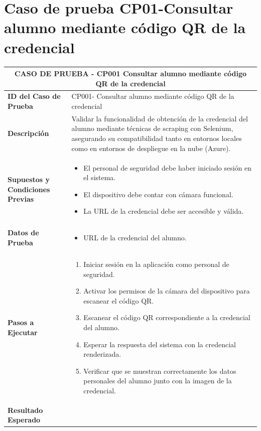 
\section{Caso de prueba CP01-Consultar alumno mediante código QR de la credencial}

\begin{longtable}{|p{5cm}|p{10cm}|}
	\hline
	\multicolumn{2}{|c|}{\textbf{CASO DE PRUEBA - CP001 Consultar alumno mediante código QR de la credencial}} \\
	\hline
	\textbf{ID del Caso de Prueba} & CP001- Consultar alumno mediante código QR de la credencial \\
	\hline
	\textbf{Descripción} & Validar la funcionalidad de obtención de la credencial del alumno mediante técnicas de scraping con Selenium, asegurando su compatibilidad tanto en entornos locales como en entornos de despliegue en la nube (Azure). \\
	\hline
	\textbf{Supuestos y Condiciones Previas} & 
	\begin{itemize}
		\item El personal de seguridad debe haber iniciado sesión en el sistema.
		\item El dispositivo debe contar con cámara funcional.
		\item La URL de la credencial debe ser accesible y válida.
	\end{itemize} \\
	\hline
	\textbf{Datos de Prueba} & 
	\begin{itemize}
		\item URL de la credencial del alumno.
	\end{itemize} \\
	\hline
	\textbf{Pasos a Ejecutar} & 
	\begin{enumerate}
		\item Iniciar sesión en la aplicación como personal de seguridad.
		\item Activar los permisos de la cámara del dispositivo para escanear el código QR.
		\item Escanear el código QR correspondiente a la credencial del alumno.
		\item Esperar la respuesta del sistema con la credencial renderizada.
		\item Verificar que se muestran correctamente los datos personales del alumno junto con la imagen de la credencial.
	\end{enumerate} \\
	\hline
	\textbf{Resultado Esperado} & 

\end{longtable}
